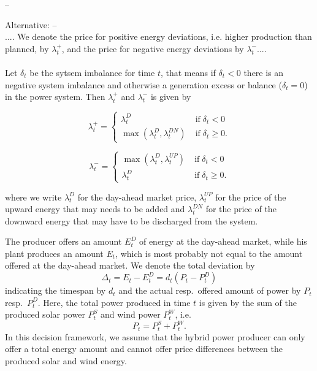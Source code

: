 --\color{red} {Alternative: --\color{black}
\\
.... We denote the price for positive energy deviations, i.e. higher production than planned, by $\lambda_{t}^{+}$, and the price for negative energy deviations by $\lambda_{t}^{-}$.... 
\\ \\
Let $\delta_t$ be the sytsem imbalance for time $t$, that means if $\delta_t<0$ there is an negative system imbalance and otherwise a generation excess or balance ($\delta_t=0$) in the power system. Then $\lambda_t^+$ and $\lambda_t^-$ is given by 
\begin{figure}[h!]
\begin{minipage}{0.5\textwidth}
\begin{equation*}
\lambda_{t}^+=\begin{cases}
\lambda_{t}^D &\mathrm{\; if \;} \delta_{t}<0
\\ \max(\lambda_t^D,\lambda_t^{DN}) &\mathrm{\; if \;} \delta_{t}\ge 0.
\end{cases}
\end{equation*}
\end{minipage}
\hfill
\begin{minipage}{0.5\textwidth}
\begin{equation*}
\lambda_t^-=\begin{cases}
\max(\lambda_t^D,\lambda_t^{UP}) &\mathrm{\; if \;} \delta_{t}<0
\\ \lambda_{t}^{D} &\mathrm{\; if \;} \delta_{t}\ge 0.
\end{cases}
\end{equation*}
\end{minipage}
\end{figure}

where we write $\lambda_{t}^{D}$ for the day-ahead market price, $\lambda_{t}^{UP}$ for the price of the upward energy that may needs to be added and $\lambda_{t}^{DN}$ for the price of the downward energy that may have to be discharged from the system. 

The producer offers an amount $E_{t}^{D}$ of energy at the day-ahead market, while his plant produces an amount $E_{t}$, which is most probably not equal to the amount offered at the day-ahead market. We denote the total deviation by 
\begin{equation*}
\Delta_{t}=E_{t}-E_{t}^{D}=d_{t}\left(P_{t}-P_{t}^{D}\right)
\end{equation*}
indicating the timespan by $d_{t}$ and the actual resp.\ offered amount of power by $P_{t}$ resp.\ $P_{t}^{D}$.
Here, the total power produced in time $t$ is given by the sum of the produced solar power $P_t^S$ and wind power $P_t^W$, i.e. 
$$ P_t = P_t^S + P_t^W.$$ In this decision framework, we assume that the hybrid power producer can only offer a total energy amount and cannot offer price differences between the produced solar and wind energy. 


}
